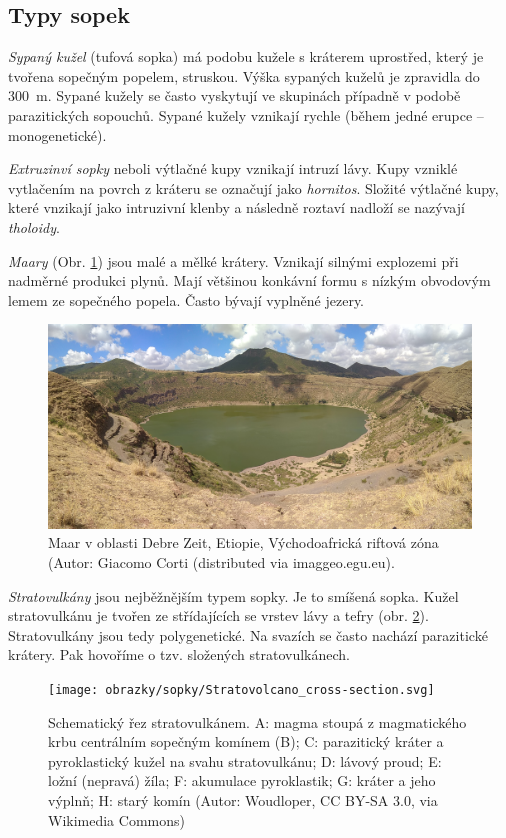 \subsection{Typy sopek}
\emph{Sypaný kužel} (tufová sopka) má podobu kužele s kráterem uprostřed, který je tvořena sopečným popelem,  struskou. Výška sypaných kuželů je zpravidla do \SI{300}{\metre}. Sypané kužely se často vyskytují ve skupinách případně v podobě parazitických sopouchů. Sypané kužely vznikají rychle (během jedné erupce -- monogenetické). 

\emph{Extruzinví sopky} neboli výtlačné kupy vznikají intruzí lávy. Kupy vzniklé vytlačením na povrch z kráteru se označují jako \emph{hornitos}. Složité výtlačné kupy, které vnzikají jako intruzivní klenby a následně roztaví nadloží se nazývají \emph{tholoidy}.

\emph{Maary} (Obr. \ref{fig:maar}) jsou malé a mělké krátery. Vznikají silnými explozemi při nadměrné produkci plynů. Mají většinou konkávní formu s nízkým obvodovým lemem ze sopečného popela. Často bývají vyplněné jezery.

\begin{figure}[h]
\includegraphics[width=\linewidth]{obrazky/sopky/maar}
\caption{Maar v oblasti Debre Zeit, Etiopie, Východoafrická riftová zóna (Autor: Giacomo Corti (distributed via imaggeo.egu.eu).}
\label{fig:maar}
\end{figure}

\emph{Stratovulkány} jsou nejběžnějším typem sopky. Je to smíšená sopka. Kužel stratovulkánu je tvořen ze střídajících se vrstev lávy a tefry (obr. \ref{fig:stratovulkan_rez}). Stratovulkány jsou tedy polygenetické. Na svazích se často nachází parazitické krátery. Pak hovoříme o tzv. složených stratovulkánech. 

\begin{figure}[h]
	\centering
	\texttt{[image: obrazky/sopky/Stratovolcano\_cross-section.svg]}
	\caption{Schematický řez stratovulkánem. A: magma stoupá z magmatického krbu centrálním sopečným komínem (B); C: parazitický kráter a pyroklastický kužel na svahu stratovulkánu; D: lávový proud; E: ložní (nepravá) žíla; F: akumulace pyroklastik; G: kráter a jeho výplnň; H: starý komín (Autor: Woudloper, CC BY-SA 3.0, via Wikimedia Commons)}
	\label{fig:stratovulkan_rez}
\end{figure}




